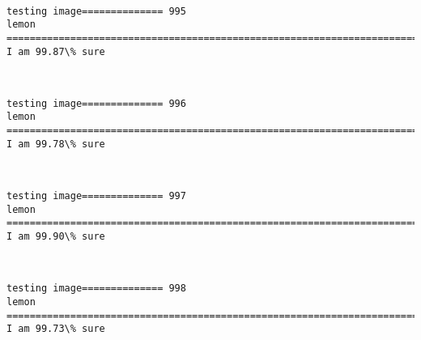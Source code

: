 \documentclass[11pt]{article}
\begin{document}
    \begin{center}
    \end{center}
    { \hspace*{\fill} \\}
    
    \begin{Verbatim}[commandchars=\\\{\}]
testing image============== 995
lemon
============================================================================
I am 99.87\% sure

    \end{Verbatim}

    \begin{center}
    \end{center}
    { \hspace*{\fill} \\}
    
    \begin{Verbatim}[commandchars=\\\{\}]
testing image============== 996
lemon
============================================================================
I am 99.78\% sure

    \end{Verbatim}

    \begin{center}
    \end{center}
    { \hspace*{\fill} \\}
    
    \begin{Verbatim}[commandchars=\\\{\}]
testing image============== 997
lemon
============================================================================
I am 99.90\% sure

    \end{Verbatim}

    \begin{center}
    \end{center}
    { \hspace*{\fill} \\}
    
    \begin{Verbatim}[commandchars=\\\{\}]
testing image============== 998
lemon
============================================================================
I am 99.73\% sure

    \end{Verbatim}
\end{document}
